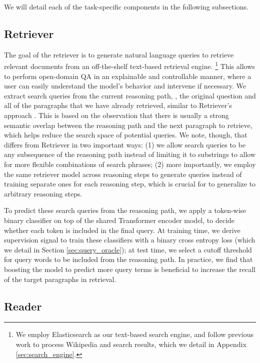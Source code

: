 We will detail each of the task-specific components in the following subsections.

\subsection{Retriever}

The goal of the retriever is to generate natural language queries to retrieve relevant documents from an off-the-shelf text-based retrieval engine.%
\footnote{We employ Elasticsearch \citep{gormley2015elasticsearch} as our text-based search engine, and follow previous work to process Wikipedia and search results, which we detail in Appendix \ref{sec:search_engine}.}
This allows \irrr{} to perform open-domain QA in an explainable and controllable manner, where a user can easily understand the model's behavior and intervene if necessary.
We extract search queries from the current reasoning path, \ie, the original question and all of the paragraphs that we have already retrieved, similar to \golden{} Retriever's approach \citep{qi2019answering}.
This is based on the observation that there is usually a strong semantic overlap between the reasoning path and the next paragraph to retrieve, which helps reduce the search space of potential queries.
We note, though, that \irrr{} differs from \golden{} Retriever in two important ways:
(1) we allow search queries to be any subsequence of the reasoning path instead of limiting it to substrings to allow for more flexible combinations of search phrases; (2) more importantly, we employ the same retriever model across reasoning steps to generate queries instead of training separate ones for each reasoning step, which is crucial for \irrr{} to generalize to arbitrary reasoning steps.

To predict these search queries from the reasoning path, we apply a token-wise binary classifier on top of the shared Transformer encoder model, to decide whether each token is included in the final query.
At training time, we derive supervision signal to train these classifiers with a binary cross entropy loss (which we detail in Section \ref{sec:query_oracle}); at test time, we select a cutoff threshold for query words to be included from the reasoning path.
In practice, we find that boosting the model to predict more query terms is beneficial to increase the recall of the target paragraphs in retrieval.

\subsection{Reader} \label{sec:reader}

